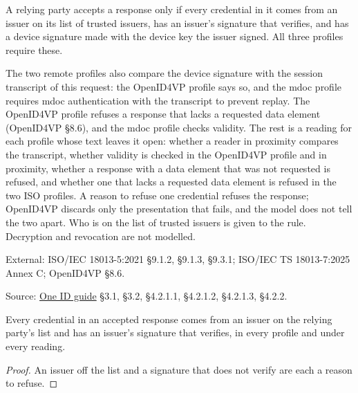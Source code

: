 \begin{definition}
  \label{def:acceptance}
  A relying party accepts a response only if every credential in it comes from
  an issuer on its list of trusted issuers, has an issuer's signature that
  verifies, and has a device signature made with the device key the issuer
  signed.  All three profiles require these.

  The two remote profiles also compare the device signature with the session
  transcript of this request: the OpenID4VP profile says so, and the mdoc
  profile requires mdoc authentication with the transcript to prevent replay.
  The OpenID4VP profile refuses a response that lacks a requested data element
  (OpenID4VP §8.6), and the mdoc profile checks validity.  The rest is a
  reading for each profile whose text leaves it open: whether a reader in
  proximity compares the transcript, whether validity is checked in the
  OpenID4VP profile and in proximity, whether a response with a data element
  that was not requested is refused, and whether one that lacks a requested
  data element is refused in the two ISO profiles.  A reason to refuse one
  credential refuses the response; OpenID4VP discards only the presentation
  that fails, and the model does not tell the two apart.  Who is on the list
  of trusted issuers is given to the rule.  Decryption and revocation are not
  modelled.

  External: ISO/IEC 18013-5:2021 §9.1.2, §9.1.3, §9.3.1; ISO/IEC TS
  18013-7:2025 Annex C; OpenID4VP §8.6.

  Source: \href{https://standards.atlassian.net/wiki/spaces/OneID/pages/2947416082/Technical+Implementation+Guide}{One ID guide} §3.1, §3.2, §4.2.1.1, §4.2.1.2, §4.2.1.3, §4.2.2.
\end{definition}

\begin{theorem}
  \label{thm:accepted-trusted-issuer}
  Every credential in an accepted response comes from an issuer on the relying
  party's list and has an issuer's signature that verifies, in every profile
  and under every reading.
\end{theorem}
\begin{proof}
  An issuer off the list and a signature that does not verify are each a reason to refuse.
\end{proof}

